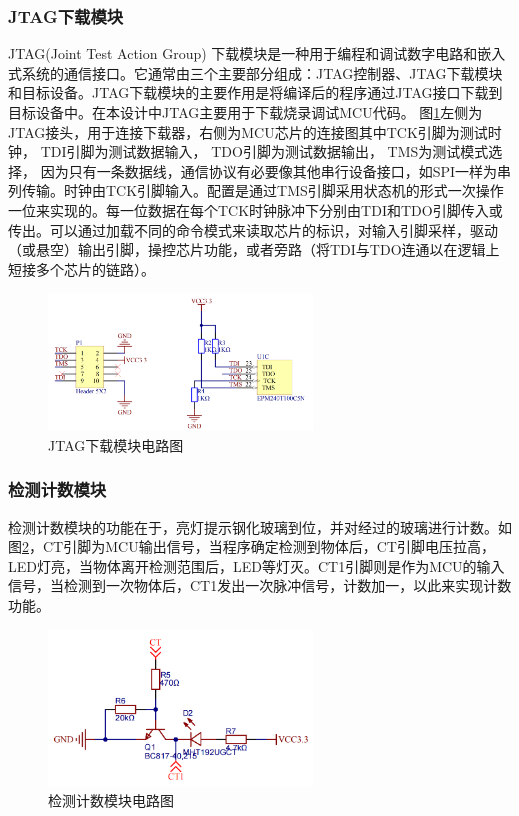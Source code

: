     \subsubsection{JTAG下载模块}
    JTAG(Joint Test Action Group) 下载模块是一种用于编程和调试数字电路和嵌入式系统的通信接口。它通常由三个主要部分组成：JTAG控制器、JTAG下载模块和目标设备。JTAG下载模块的主要作用是将编译后的程序通过JTAG接口下载到目标设备中。在本设计中JTAG主要用于下载烧录调试MCU代码。
    图\ref{JTAG下载模块电路图}左侧为JTAG接头，用于连接下载器，右侧为MCU芯片的连接图其中TCK引脚为测试时钟，
    TDI引脚为测试数据输入，
TDO引脚为测试数据输出，
TMS为测试模式选择，
因为只有一条数据线，通信协议有必要像其他串行设备接口，如SPI一样为串列传输。时钟由TCK引脚输入。配置是通过TMS引脚采用状态机的形式一次操作一位来实现的。每一位数据在每个TCK时钟脉冲下分别由TDI和TDO引脚传入或传出。可以通过加载不同的命令模式来读取芯片的标识，对输入引脚采样，驱动（或悬空）输出引脚，操控芯片功能，或者旁路（将TDI与TDO连通以在逻辑上短接多个芯片的链路）。
    \begin{figure}[ht]
        \centering
        \includegraphics[width=7cm]{figure/JTAG download circuit.png}
        \caption{JTAG下载模块电路图}
        \label{JTAG下载模块电路图}
    \end{figure}
    
    \subsubsection{检测计数模块}
    检测计数模块的功能在于，亮灯提示钢化玻璃到位，并对经过的玻璃进行计数。如图\ref{检测计数模块电路图}，CT引脚为MCU输出信号，当程序确定检测到物体后，CT引脚电压拉高，LED灯亮，当物体离开检测范围后，LED等灯灭。CT1引脚则是作为MCU的输入信号，当检测到一次物体后，CT1发出一次脉冲信号，计数加一，以此来实现计数功能。
    \begin{figure}[ht]
        \centering
        \includegraphics[width=7cm]{figure/detection count circuit.png}
        \caption{检测计数模块电路图}
        \label{检测计数模块电路图}
    \end{figure}
\newpage
